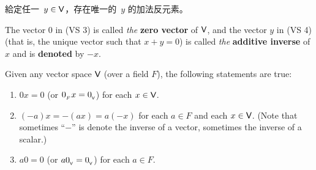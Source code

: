 \begin{note}
給定任一\ \(y \in \textsf{V}\)，存在唯一的\ \(y\) 的加法反元素。
\end{note}

\begin{additional definition} \label{adef 1.5}
The vector \(0\) in  (VS 3) is called \emph{the} \textbf{zero vector} of \(\textsf{V}\), and the vector \(y\) in (VS 4) (that is, the unique vector such that \(x + y = 0\)) is called \emph{the} \textbf{additive inverse} of \(x\) and is \textbf{denoted} by \(-x\).
\end{additional definition}

\begin{theorem} \label{thm 1.2}
Given any vector space \(\textsf{V}\) (over a field \(F\)), the following statements are true:
\begin{enumerate}
    \item \(0x = 0\) (or \(0_{_F} x = 0_{_{\textsf{V}}}\)) for each \(x \in \textsf{V}\).
    \item \((-a)x = -(ax) = a(-x)\) for each \(a \in F\) and each \(x \in \textsf{V}\). (Note that sometimes ``\(-\)'' is denote the inverse of a vector, sometimes the inverse of a scalar.)
    \item \(a0 = 0\) (or \(a0_{_{\textsf{V}}} = 0_{_{\textsf{V}}}\)) for each \(a \in F\).
\end{enumerate}
\end{theorem}

